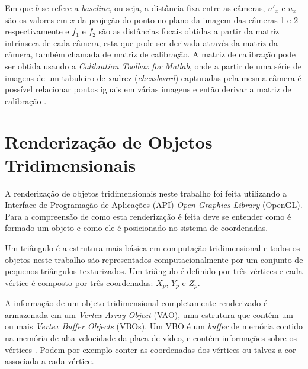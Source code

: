 {Em que $b$ se refere a \textit{baseline}, ou seja, a distância fixa entre as câmeras, $u'_x$ e $u_x$ são os valores em $x$ da projeção do ponto no plano da imagem das câmeras 1 e 2 respectivamente e $f_1$ e $f_2$ são as distâncias focais obtidas a partir da matriz intrínseca de cada câmera, esta que pode ser derivada através da matriz da câmera, também chamada de matriz de calibração. A matriz de calibração pode ser obtida usando a \textit{Calibration Toolbox for Matlab}, onde a partir de uma série de imagens de um tabuleiro de xadrez (\textit{chessboard}) capturadas pela mesma câmera é possível relacionar pontos iguais em várias imagens e então derivar a matriz de calibração \cite{bouguetML}.

\section{Renderização de Objetos Tridimensionais}

A renderização de objetos tridimensionais neste trabalho foi feita utilizando a  Interface de Programação de Aplicações (API)  \textit{Open Graphics Library} (OpenGL). Para a compreensão de como esta renderização é feita deve se entender como é formado um objeto e como ele é posicionado no sistema de coordenadas. 

Um triângulo é a estrutura mais básica em computação tridimensional \cite{openGlWikibooks} e todos os objetos neste trabalho são representados computacionalmente por um conjunto de pequenos triângulos texturizados. Um triângulo é definido por três vértices e cada vértice é composto por três coordenadas: $X_p$, $Y_p$ e $Z_p$.

A informação de um objeto tridimensional completamente renderizado é armazenada em um  \textit{Vertex Array Object} (VAO), uma estrutura que contém um ou mais  \textit{Vertex Buffer Objects} (VBOs). Um VBO é um \textit{buffer} de memória contido na memória de alta velocidade da placa de vídeo, e contém informações sobre os vértices \cite{openGlOrg}. Podem por exemplo conter as coordenadas dos vértices ou talvez a cor associada a cada vértice.


}
